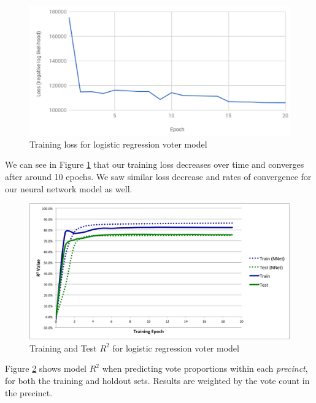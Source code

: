 \documentclass[10pt, letterpaper]{article}
\begin{document}
\begin{multicols}{2}
\begin{figure}[H]
\begin{center}
\includegraphics[scale=0.22]{training-loss-cropped}
\end{center}
\caption{Training loss for logistic regression voter model}
\label{fig:training-loss}
\end{figure}
We can see in Figure \ref{fig:training-loss} that our training loss decreases over time and converges after around 10 epochs. We saw similar loss decrease and rates of convergence for our neural network model as well.

\begin{figure}[H]
\begin{center}
\includegraphics[scale=0.28]{holdout-R2-both}
\end{center}
\caption{Training and Test $R^2$ for logistic regression voter model}
\label{fig:holdout-R2}
\end{figure}

Figure \ref{fig:holdout-R2} shows model $R^2$ when predicting vote proportions within each \emph{precinct}, for both the training and holdout sets. Results are weighted by the vote count in the precinct. 


\end{multicols}
\end{document}
